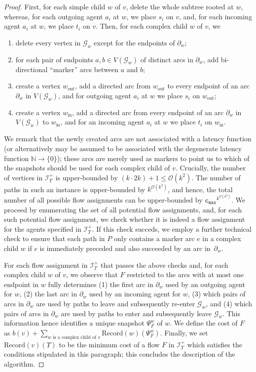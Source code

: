 \documentclass[letterpaper]{article} %
\newcommand{\bigoh}{\ensuremath{{\mathcal O}}}
\newcommand{\cmax}{\mathtt{c_{max}}}
\newcommand{\forgottenG}{\mathcal{G}}
\newcommand{\Rec}{\text{Record}}
\begin{document}
\begin{proof}
First, for each simple child $w$ of $v$, delete the whole subtree rooted at $w$, whereas, for each outgoing agent $a_i$ at $w$, we place $s_i$ on $v$, and, for each incoming agent $a_i$ at $w$, we place $t_i$ on $v$.
Then, for each complex child $w$ of $v$, we
\begin{enumerate}
\item delete every vertex in $\forgottenG_w$ except for the endpoints of $\partial_w$;
\item for each pair of endpoints $a,b\in V(\forgottenG_w)$ of distinct arcs in $\partial_w$, add bi-directional ``marker'' arcs between $a$ and $b$;
\item create a vertex $w_\text{out}$, add a directed arc from $w_\text{out}$ to every endpoint of an arc $\partial_w$ in $V(\forgottenG_w)$, and for outgoing agent $a_i$ at $w$ we place $s_i$ on $w_\text{out}$;
\item create a vertex $w_\text{in}$, add a directed arc from every endpoint of an arc $\partial_w$ in $V(\forgottenG_w)$ to $w_\text{in}$, and for an incoming agent $a_i$ at $w$ we place $t_i$ on $w_\text{in}$.
\end{enumerate}


We remark that the newly created arcs are not associated with a latency function (or alternatively may be assumed to be associated with the degenerate latency function $\mathbb{N}\rightarrow \{0\}$); these arcs are merely used as markers to point us to which of the snapshots should be used for each complex child of $v$. Crucially, the number of vertices in $\mathcal{I}^+_\Upsilon$ is upper-bounded by $(k\cdot 2k)+1\leq \bigoh(k^2)$. The number of paths in such an instance is upper-bounded by $k^{\bigoh(k^2)}$, and hence, the total number of all possible flow assignments can be upper-bounded by $\cmax^{k^{\bigoh(k^2)}}$. We proceed by enumerating the set of all potential flow assignments, and, for each such potential flow assignment, we check whether it is indeed a flow assignment for the agents specified in $\mathcal{I}^+_\Upsilon$. If this check succeds, we employ a further technical check to ensure that each path in $P$ only contains a marker arc $e$ in a complex child $w$ if $e$ is immediately preceded and also succeeded by an arc in~$\partial_w$.

For each flow assignment in $\mathcal{I}^+_\Upsilon$ that passes the above checks and, for each complex child $w$ of $v$, we observe that $F$ restricted to the arcs with at most one endpoint in $w$ fully determines (1) the first arc in $\partial_w$ used by an outgoing agent for $w$, (2) the last arc in $\partial_w$ used by an incoming agent for $w$, (3) which pairs of arcs in $\partial_w$ are used by paths to leave and subsequently re-enter $\forgottenG_w$, and (4) which pairs of arcs in $\partial_w$ are used by paths to enter and subsequently leave $\forgottenG_w$. This information hence identifies a unique snapshot $\Psi^w_F$ of $w$. We define the cost of $F$ as $b(v)+\sum_{w\text{ is a complex child of }v}\Rec(w)(\Psi^w_F)$. Finally, we set $\Rec(v)(\Upsilon)$ to be the minimum cost of a flow $F$ in $\mathcal{I}^+_\Upsilon$ which satisfies the conditions stipulated in this paragraph; this concludes the description of the algorithm.


\end{proof}
\end{document}
